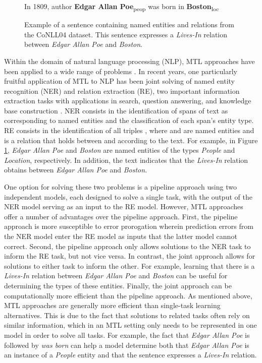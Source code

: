 \documentclass{article}
\begin{document}
\begin{figure}[t]
    In 1809, author \textbf{Edgar Allan Poe}\textsubscript{\sc peop} was born in \textbf{Boston}\textsubscript{\sc loc}
        \caption{Example of a sentence containing named entities and relations from the CoNLL04 dataset. This sentence expresses a {\em Lives-In} relation between {\em Edgar Allan Poe} and {\em Boston}.}
    \label{fig:conll_ex}
\end{figure}

Within the domain of natural language processing (NLP), MTL approaches have been applied to a wide range of problems \cite{li2019empirical}. In recent years, one particularly fruitful application of MTL to NLP has been joint solving of named entity recognition (NER) and relation extraction (RE), two important information extraction tasks with applications in search, question answering, and knowledge base construction \cite{jiang2012information}. NER consists in the identification of spans of text as corresponding to named entities and the classification of each span's entity type. RE consists in the identification of all triples , where  and  are named entities and  is a relation that holds between  and  according to the text. For example, in Figure \ref{fig:conll_ex}, {\em Edgar Allan Poe} and {\em Boston} are named entities of the types {\em People} and {\em Location}, respectively. In addition, the text indicates that the {\em Lives-In} relation obtains between {\em Edgar Allan Poe} and {\em Boston}.

One option for solving these two problems is a pipeline approach using two independent models, each designed to solve a single task, with the output of the NER model serving as an input to the RE model. However, MTL approaches offer a number of advantages over the pipeline approach. First, the pipeline approach is more susceptible to error prorogation wherein prediction errors from the NER model enter the RE model as inputs that the latter model cannot correct. Second, the pipeline approach only allows solutions to the NER task to inform the RE task, but not vice versa. In contrast, the joint approach allows for solutions to either task to inform the other. For example, learning that there is a {\em Lives-In} relation between {\em Edgar Allan Poe} and {\em Boston} can be useful for determining the types of these entities. Finally, the joint approach can be computationally more efficient than the pipeline approach. As mentioned above, MTL approaches are generally more efficient than single-task learning alternatives. This is due to the fact that solutions to related tasks often rely on similar information, which in an MTL setting only needs to be represented in one model in order to solve all tasks. For example, the fact that {\em Edgar Allan Poe} is followed by {\em was born} can help a model determine both that {\em Edgar Allan Poe} is an instance of a {\em People} entity and that the sentence expresses a {\em Lives-In} relation.
\end{document}

